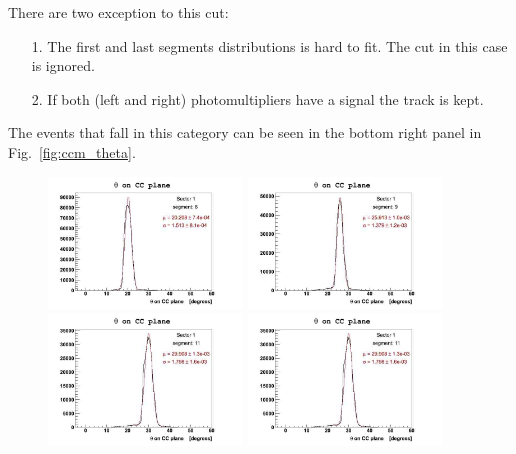 There are two exception to this cut:
\begin{itemize}
 \item [1.] The first and last segments distributions is hard to fit. The cut in this case is ignored.
 \item [2.] If both (left and right) photomultipliers have a signal the track is kept.
\end{itemize}
The events that fall in this category can be seen in the bottom right panel in Fig.~\ref{fig:ccm_theta}.

\begin{figure}[h]
  \centering
		\includegraphics[width=0.46\textwidth]{img/ccm_slice6_fit_sect1.jpg}
		\includegraphics[width=0.46\textwidth]{img/ccm_slice9_fit_sect1.jpg}
		\includegraphics[width=0.46\textwidth]{img/ccm_slice11_fit_sect1.jpg}
		\includegraphics[width=0.46\textwidth]{img/ccm_slice14_fit_sect1.jpg}

\end{figure}
